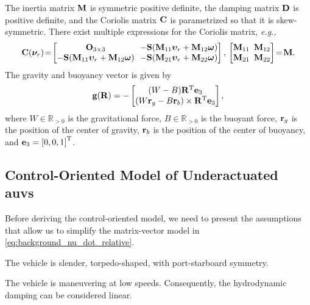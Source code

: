 The inertia matrix $\mathbf{M}$ is symmetric positive definite, the damping matrix $\mathbf{D}$ is positive definite, and the Coriolis matrix $\mathbf{C}$ is parametrized so that it is skew-symmetric.
There exist multiple expressions for the Coriolis matrix, \emph{e.g.,}
\begin{equation}
    \label{eq:background_coriolis}
    \mat{C}(\vel_r)\! =\!
    \begin{bmatrix}
        \mat{O}_{3 \times 3} & \!\!-\mat{S}(\mat{M}_{11}\bvel_r + \mat{M}_{12}\bs{\omega}) \\
        -\mat{S}(\mat{M}_{11}\bvel_r + \mat{M}_{12}\bs{\omega}) & \!\!-\mat{S}(\mat{M}_{21}\bvel_r + \mat{M}_{22}\bs{\omega})
    \end{bmatrix}, \,
    \begin{bmatrix}
        \mat{M}_{11} & \!\!\!\mat{M}_{12} \\ \mat{M}_{21} & \!\!\!\mat{M}_{22}
    \end{bmatrix}\!
    = \!\mat{M}.
\end{equation}
The gravity and buoyancy vector is given by \cite{fossen_handbook_2011}
\begin{equation}
    \mathbf{g}(\mathbf{R}) = -
    \begin{bmatrix}
        (W - B) \mathbf{R}^{\mathrm{T}} \mathbf{e}_3 \\
        (W\mathbf{r}_g - B\mathbf{r}_b) \times \mathbf{R}^{\mathrm{T}} \mathbf{e}_3
    \end{bmatrix},
\end{equation}
where $W \in \mathbb{R}_{> 0}$ is the gravitational force, $B \in \mathbb{R}_{> 0}$ is the buoyant force, $\mathbf{r}_g$ is the position of the center of gravity, $\mathbf{r}_b$ is the position of the center of buoyancy, and $\mathbf{e}_3 = \left[0, 0, 1\right]^{\mathrm{T}}$.

\subsection{Control-Oriented Model of Underactuated \glspl{auv}}
\label{sec:model_control_oriented}
Before deriving the control-oriented model, we need to present the assumptions that allow us to simplify the matrix-vector model in \eqref{eq:background_nu_dot_relative}.

\begin{asm}
    \label{asm:symmetric}
    The vehicle is slender, torpedo-shaped, with port-starboard symmetry.
\end{asm}

\begin{asm}
    \label{asm:damping}
    The vehicle is maneuvering at low speeds.
    Consequently, the hydrodynamic damping can be considered linear.
\end{asm}

